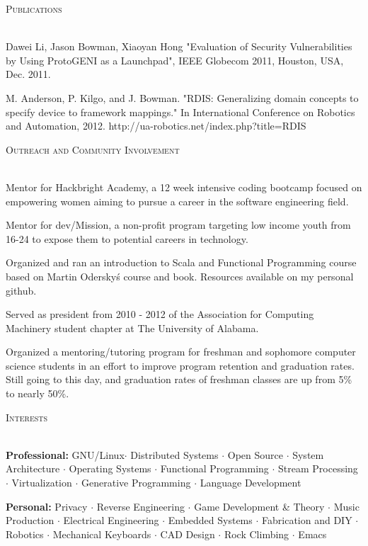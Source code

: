 \documentclass[12pt,letterpaper]{article}
\newcommand{\lineunder}{\vspace*{-8pt} \\ \hspace*{-18pt} \hrulefill \\}
\newcommand{\header}[1]{{\hspace*{-15pt}\vspace*{6pt} \textsc{#1}} \vspace*{-6pt} \lineunder}
\begin{document}
\vspace*{3pt}

\header{Publications}
\vspace*{-5pt}
\begin{itemize*}
\item Dawei Li, Jason Bowman, Xiaoyan Hong "Evaluation of Security Vulnerabilities by Using ProtoGENI as a Launchpad", IEEE Globecom 2011, Houston, USA, Dec. 2011.
\item M. Anderson, P. Kilgo, and J. Bowman. "RDIS: Generalizing domain concepts to specify device to framework mappings." In International Conference on Robotics and Automation, 2012. http://ua-robotics.net/index.php?title=RDIS
\end{itemize*}

\vspace*{3pt}

\header{Outreach and Community Involvement}
\vspace*{-5pt}
\begin{itemize*}
\item Mentor for Hackbright Academy, a 12 week intensive coding bootcamp focused
  on empowering women aiming to pursue a career in the software engineering field.
\item Mentor for dev/Mission, a non-profit program targeting low income youth
  from 16-24 to expose them to potential careers in technology.
\item Organized and ran an introduction to Scala and Functional Programming
  course based on Martin Odersky\'s course and book. Resources available on
  my personal github. 
\item Served as president from 2010 - 2012 of the Association for Computing
  Machinery student chapter at The University of Alabama.
\item Organized a mentoring/tutoring program for freshman and sophomore computer
  science students in an effort to improve program retention and graduation
  rates. Still going to this day, and graduation rates of freshman classes are
  up from 5\% to nearly 50\%.
\end{itemize*}

\vspace*{3pt}

\header{Interests}
\vspace*{-5pt}
\begin{itemize*}
\item \textbf{Professional:} GNU/Linux$\cdot$ Distributed Systems $\cdot$ Open Source $\cdot$
  System Architecture $\cdot$ Operating Systems $\cdot$ Functional Programming
  $\cdot$ Stream Processing $\cdot$ Virtualization $\cdot$
  Generative Programming $\cdot$ Language Development
\item \textbf{Personal:} Privacy $\cdot$ Reverse Engineering $\cdot$ Game
  Development \& Theory $\cdot$ Music Production $\cdot$ Electrical Engineering
  $\cdot$ Embedded Systems $\cdot$ Fabrication and DIY $\cdot$ Robotics $\cdot$ Mechanical
  Keyboards $\cdot$ CAD Design $\cdot$ Rock Climbing $\cdot$ Emacs 
\end{itemize*}
\vspace*{8pt}
\end{document}
